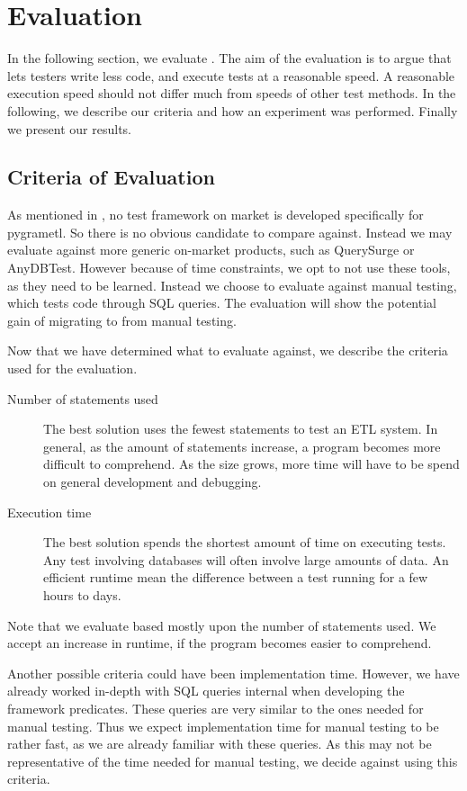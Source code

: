 \section{Evaluation}\label{sect:eval}
In the following section, we evaluate \FW{}. The aim of the evaluation is to argue that \FW{} lets testers write less code, and execute tests at a reasonable speed. A reasonable execution speed should not differ much from speeds of other test methods. In the following, we describe our criteria and how an experiment was performed. Finally we present our results.

\subsection{Criteria of Evaluation}\label{subsect:CoE}
As mentioned in , no test framework on market is developed specifically for pygrametl. So there is no obvious candidate to compare against. Instead we may evaluate against more generic on-market products, such as QuerySurge or AnyDBTest. However because of time constraints, we opt to not use these tools, as they need to be learned. Instead we choose to evaluate against manual testing, which tests code through SQL queries. The evaluation will show the potential gain of migrating to \FW{} from manual testing.

Now that we have determined what to evaluate \FW{} against, we describe the criteria used for the evaluation.

\begin{description}
\item[Number of statements used] The best solution uses the fewest statements to test an ETL system. In general, as the amount of statements increase, a program becomes more difficult to comprehend. As the size grows, more time will have to be spend on general development and debugging.
\item[Execution time] The best solution spends the shortest amount of time on executing tests. Any test involving databases will often involve large amounts of data. An efficient runtime mean the difference between a test running for a few hours to days.
\end{description}

Note that we evaluate based mostly upon the number of statements used. We accept an increase in runtime, if the program becomes easier to comprehend.

Another possible criteria could have been implementation time. However, we have already worked in-depth with SQL queries internal when developing the framework predicates. These queries are very similar to the ones needed for manual testing. Thus we expect implementation time for manual testing to be rather fast, as we are already familiar with these queries. As this may not be representative of the time needed for manual testing, we decide against using this criteria.

